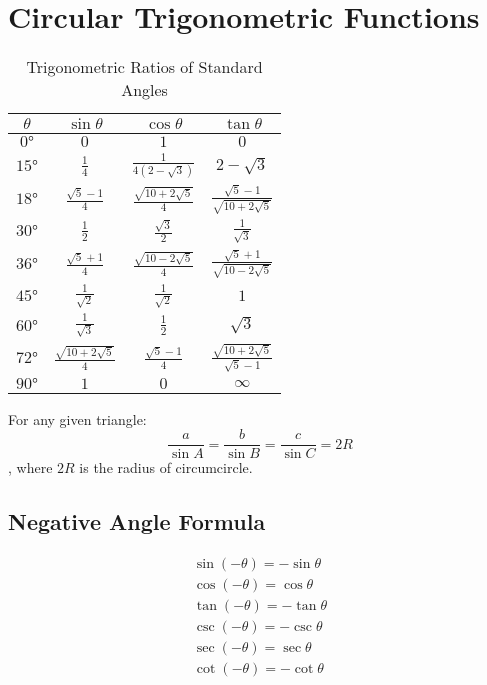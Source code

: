 \large{\chapter{Circular Trigonometric Functions}}
\begin{table}[htbp]
	\centering
	\begin{tabular}{c c c c}
		\toprule
		$\theta$&$\sin \theta$&$\cos \theta$&$\tan \theta$\\
		\midrule
		$\ang{0}$&$0$&$1$&$0$\\
		$\ang{15}$&$\frac{1}{4}$&$\frac{1}{4(2-\sqrt{3})}$&$2-\sqrt{3}$\\
		$\ang{18}$&$\frac{\sqrt{5}-1}{4}$&$\frac{\sqrt{10+2\sqrt{5}}}{4}$&$\frac{\sqrt{5}-1}{\sqrt{10+2\sqrt{5}}}$\\
		$\ang{30}$&$\frac{1}{2}$&$\frac{\sqrt{3}}{2}$&$\frac{1}{\sqrt{3}}$\\
		$\ang{36}$&$\frac{\sqrt{5}+1}{4}$&$\frac{\sqrt{10-2\sqrt{5}}}{4}$&$\frac{\sqrt{5}+1}{\sqrt{10-2\sqrt{5}}}$\\
		$\ang{45}$&$\frac{1}{\sqrt{2}}$&$\frac{1}{\sqrt{2}}$&$1$\\
		$\ang{60}$&$\frac{1}{\sqrt{3}}$&$\frac{1}{2}$&$\sqrt{3}$\\
		$\ang{72}$&$\frac{\sqrt{10+2\sqrt{5}}}{4}$&$\frac{\sqrt{5}-1}{4}$&$\frac{\sqrt{10+2\sqrt{5}}}{\sqrt{5}-1}$\\
		$\ang{90}$&$1$&$0$&$\infty$\\
		\hline
	\end{tabular}
	\caption{Trigonometric Ratios of Standard Angles}
	\label{table1}
\end{table}

For any given triangle:
\begin{equation}
	\dfrac{a}{\sin A}=\dfrac{b}{\sin B}=\dfrac{c}{\sin C}=2R
\end{equation}, where $2R$ is the radius of circumcircle.

\section{Negative Angle Formula}
\begin{align}
	\sin (-\theta)=-\sin \theta\\
	\cos (-\theta)=\cos \theta\\
	\tan (-\theta)=-\tan \theta\\
	\csc (-\theta)=-\csc \theta\\
	\sec (-\theta)=\sec \theta\\
	\cot (-\theta)=-\cot \theta
\end{align}

